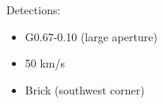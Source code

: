 Detections:
\begin{itemize}
\item G0.67-0.10 (large aperture)
\item 50 km/s 
\item Brick (southwest corner)
\end{itemize}